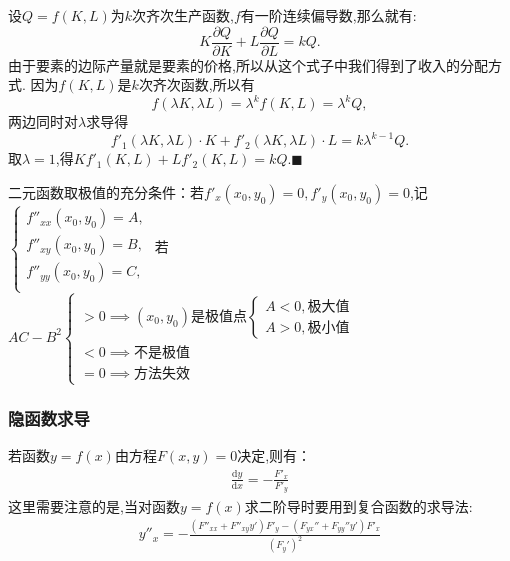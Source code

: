 \begin{theorem}[Euler 公式]
    设$Q=f(K,L)$为$k$次齐次生产函数,$f$有一阶连续偏导数,那么就有:
    \begin{equation}
        K \frac{\partial Q}{\partial K} +L \frac{\partial Q}{\partial L} = kQ.
    \end{equation}
    由于要素的边际产量就是要素的价格,所以从这个式子中我们得到了收入的分配方式.
    \zheng 因为$f(K,L)$是$k$次齐次函数,所以有 
    \begin{equation*}
        f(\lambda K,\lambda L) = \lambda^k f(K,L) =\lambda^k Q,
    \end{equation*}
    两边同时对$\lambda$求导得
    \begin{equation*}
        f'_1(\lambda K,\lambda L)\cdot K + f'_2(\lambda K,\lambda L)\cdot L = k\lambda^{k-1}Q.
    \end{equation*}
    取$\lambda = 1$,得$Kf'_1(K,L) + Lf'_2(K,L) = kQ. $\hfill $\blacksquare $
\end{theorem}

二元函数取极值的充分条件：若$f'_x(x_0,y_0)=0,f'_y(x_0,y_0)=0$,记$
\begin{cases}
    f''_{xx}(x_0,y_0)=A,\\
    f''_{xy}(x_0,y_0)=B,\\
    f''_{yy}(x_0,y_0)=C,\\
\end{cases}$
若$AC-B^2
\begin{cases} 
    >0 \implies \text{$(x_0,y_0)$是极值点}\begin{cases}
        A<0,\text{极大值}\\
        A>0,\text{极小值}
    \end{cases}\\
    <0 \implies \text{不是极值}\\
    =0 \implies \text{方法失效}
\end{cases}$

\subsubsection{隐函数求导}
若函数$y=f(x)$由方程$F(x,y)=0$决定,则有：
\begin{gather*}
    \frac{\mathrm{d} y}{\mathrm{d} x} =-\frac{F'_x}{F'_y}
\end{gather*}
这里需要注意的是,当对函数$y=f(x)$求二阶导时要用到复合函数的求导法:
\begin{align*}
    y''_x=-\frac{(F''_{xx}+F''_{xy}y')F'_y-(F_{yx}''+F_{yy}''y')F'_x}{(F_y')^2}
\end{align*}

